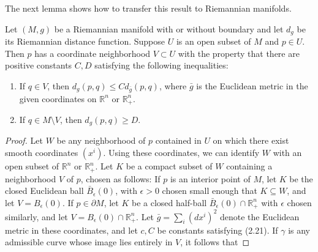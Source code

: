 

The next lemma shows how to transfer this result to Riemannian manifolds.

\begin{lemma}\label{lem:distance-comparison-neighborhood}
\leanok
{}
Let $(M, g)$ be a Riemannian manifold with or without boundary and
let $d_g$ be its Riemannian distance function. Suppose $U$ is an open subset of $M$ and
$p \in U$. Then $p$ has a coordinate neighborhood $V \subset U$ with the property that there
are positive constants $C, D$ satisfying the following inequalities:
\begin{enumerate}
\item[(a)] If $q \in V$, then $d_g(p,q) \leq Cd_{\bar{g}}(p,q)$, where $\bar{g}$ is the Euclidean metric in the
given coordinates on $\mathbb{R}^n$ or $\mathbb{R}^n_+$.
\item[(b)] If $q \in M \setminus V$, then $d_g(p,q) \geq D$.
\end{enumerate}

\begin{proof}
\leanok
Let $W$ be any neighborhood of $p$ contained in $U$ on which there exist smooth
coordinates $(x^i)$. Using these coordinates, we can identify $W$ with an open subset
of $\mathbb{R}^n$ or $\mathbb{R}^n_+$. Let $K$ be a compact subset of $W$ containing a neighborhood $V$ of
$p$, chosen as follows: If $p$ is an interior point of $M$, let $K$ be the closed Euclidean
ball $\bar{B}_\epsilon(0)$, with $\epsilon > 0$ chosen small enough that $K \subseteq W$, and let $V =
B_\epsilon(0)$. If $p \in \partial M$, let $K$ be a closed half-ball $\bar{B}_\epsilon(0) \cap \mathbb{R}^n_+$ with $\epsilon$ chosen similarly, and let $V =
B_\epsilon(0) \cap \mathbb{R}^n_+$. Let $\bar{g} = \sum_i (dx^i)^2$ denote the Euclidean metric in these coordinates,
and let $c, C$ be constants satisfying (2.21). If $\gamma$ is any admissible curve whose image
lies entirely in $V$, it follows that


\end{proof}
\end{lemma}
